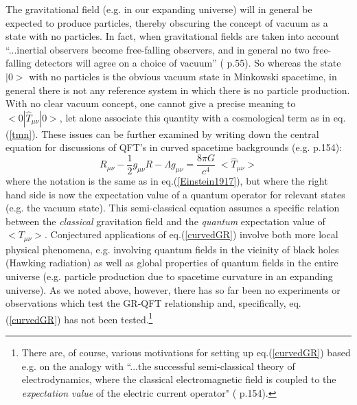 \documentclass[12pt]{article}
\newcommand{\beq}{\begin{equation}}
\newcommand{\eeq}{\end{equation}}
\begin{document}
The gravitational field (e.g. in our expanding universe) will in
general be expected to produce particles, thereby obscuring the
concept of vacuum as a state with no particles. In fact, when
gravitational fields are taken into account ``...inertial
observers become free-falling observers, and in general no two
free-falling detectors will agree on a choice of vacuum''
(\cite{birrell82} p.55). So whereas the state $|0>$ with no
particles is the obvious vacuum state in Minkowski spacetime, in
general there is not any reference system in which there is no
particle production. With no clear vacuum concept, one cannot give
a precise meaning to $<0|\hat{T}_{\mu\nu}|0>$, let alone associate
this quantity with a cosmological term as in eq.(\ref{tmn}). 
These issues can be further examined by writing down the central
equation for discussions of QFT's in curved spacetime backgrounds
(e.g. \cite{birrell82} p.154):
\beq
\label{curvedGR}
R_{\mu \nu} - \frac{1}{2} g_{\mu \nu} R -
\Lambda g_{\mu \nu} =  \frac{8 \pi G}{c^4} \; <\hat{T}_{\mu \nu}>
\eeq
where the notation is the same as in eq.(\ref{Einstein1917}), but
where the right hand side is now the expectation value of a
quantum operator for relevant states (e.g. the vacuum state). This
semi-classical equation assumes a specific relation between the
{\em classical} gravitation field and the {\em quantum}
expectation value of $<T_{\mu\nu}>$. Conjectured applications of
eq.(\ref{curvedGR}) involve both more local physical phenomena,
e.g. involving quantum fields in the vicinity of black holes
(Hawking radiation) as well as global properties of quantum fields
in the entire universe (e.g. particle production due to spacetime
curvature in an expanding universe). As we noted above, however,
there has so far been no experiments or observations which test
the GR-QFT relationship and, specifically, eq. (\ref{curvedGR}) has
not been tested.\footnote{There are, of course, various motivations
for setting up eq.(\ref{curvedGR}) based e.g. on the analogy with
``...the successful semi-classical theory of electrodynamics, where
the classical electromagnetic field is coupled to the {\em expectation
value} of the electric current operator" (\cite{birrell82} p.154).} 
\end{document}
